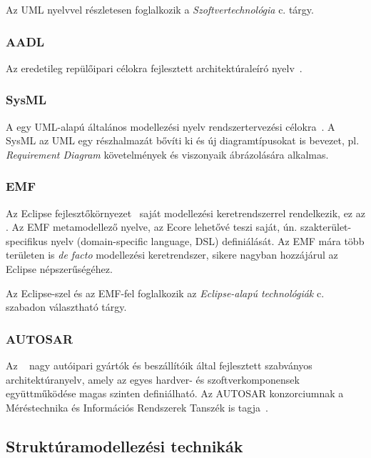 
Az UML nyelvvel részletesen foglalkozik a \emph{Szoftvertechnológia} c. tárgy.

\subsubsection{AADL}

Az  eredetileg repülőipari célokra fejlesztett architektúraleíró nyelv~\cite{AADL}.

\subsubsection{SysML}

A  egy UML-alapú általános modellezési nyelv rendszertervezési célokra~\cite{SysML}. A SysML az UML egy részhalmazát bővíti ki és új diagramtípusokat is bevezet, pl. \emph{Requirement Diagram} követelmények és viszonyaik ábrázolására alkalmas.

\subsubsection{EMF}

Az Eclipse fejlesztőkörnyezet~\cite{eclipse} saját modellezési keretrendszerrel rendelkezik, ez az . Az EMF metamodellező nyelve, az Ecore lehetővé teszi saját, ún. szakterület-specifikus nyelv (domain-specific language, DSL) definiálását. Az EMF mára több területen is \emph{de facto} modellezési keretrendszer, sikere nagyban hozzájárul az Eclipse népszerűségéhez.

Az Eclipse-szel és az EMF-fel foglalkozik az \emph{Eclipse-alapú technológiák} c. szabadon választható tárgy.

\subsubsection{AUTOSAR}

Az ~\cite{autosar} nagy autóipari gyártók és beszállítóik által fejlesztett szabványos architektúranyelv, amely az egyes hardver- és szoftverkomponensek együttműködése magas szinten definiálható. Az AUTOSAR konzorciumnak a Méréstechnika és Információs Rendszerek Tanszék is tagja~\cite{autosar-attendees}.

\subsection{Struktúramodellezési technikák}



